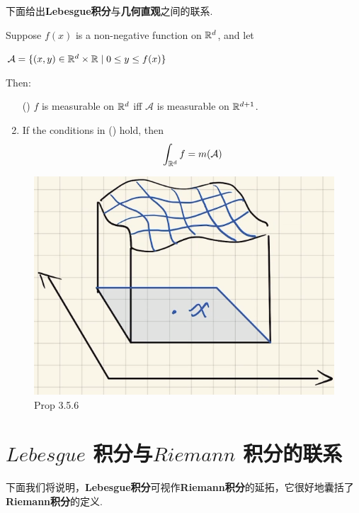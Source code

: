 	\vspace{2em}
	下面给出\textbf{Lebesgue积分}与\textbf{几何直观}之间的联系.
	\begin{corollary}\label{cor 3.5.6}
		Suppose $f(x)$ is a non-negative function on $\mathbb{R}^d$, and let 
		\begin{center}
			$\mathcal{A} = \{ (x , y) \in \mathbb{R}^d \times \mathbb{R} \mid 0 \leq y \leq f(x) \}$
		\end{center}
		Then:
		\begin{enumerate}
			\item[(\rmnum{1})]$f$ is measurable on $\mathbb{R}^d$ iff $\mathcal{A}$ is measurable on $\mathbb{R}^{d + 1}$.
			
			\item If the conditions in () hold, then
			\begin{align}
				\int_{\mathbb{R}^d}{f}= m(\mathcal{A})
			\end{align}
		\end{enumerate}
	
		\begin{figure}[thbp!]
			\centering
			\includegraphics[width=0.25\linewidth]{figure/3.5.2-2}
			\caption{Prop 3.5.6}
			\label{pic : 3.5.2-2} %
		\end{figure}
	\end{corollary}

\newpage
\section{$Lebesgue$ 积分与$Riemann$ 积分的联系}
	下面我们将说明，\textbf{Lebesgue积分}可视作\textbf{Riemann积分}的延拓，它很好地囊括了\textbf{Riemann积分}的定义.
	
